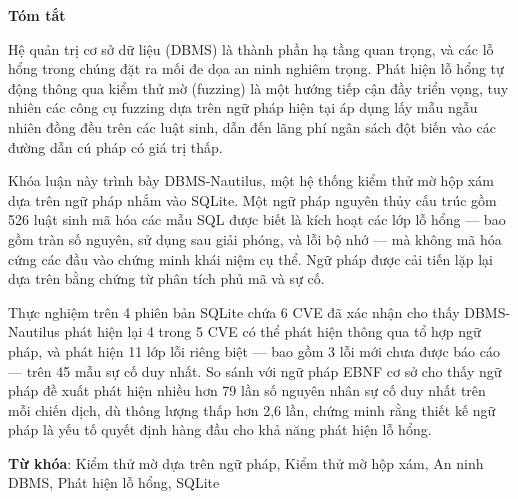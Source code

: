 \begin{center}
\textbf{\large{Tóm tắt}}
\end{center}

\begin{small}

Hệ quản trị cơ sở dữ liệu (DBMS) là thành phần hạ tầng quan trọng, và các lỗ hổng trong chúng đặt ra mối đe dọa an ninh nghiêm trọng. Phát hiện lỗ hổng tự động thông qua kiểm thử mờ (fuzzing) là một hướng tiếp cận đầy triển vọng, tuy nhiên các công cụ fuzzing dựa trên ngữ pháp hiện tại áp dụng lấy mẫu ngẫu nhiên đồng đều trên các luật sinh, dẫn đến lãng phí ngân sách đột biến vào các đường dẫn cú pháp có giá trị thấp.

Khóa luận này trình bày DBMS-Nautilus, một hệ thống kiểm thử mờ hộp xám dựa trên ngữ pháp nhắm vào SQLite. Một ngữ pháp nguyên thủy cấu trúc gồm 526 luật sinh mã hóa các mẫu SQL được biết là kích hoạt các lớp lỗ hổng --- bao gồm tràn số nguyên, sử dụng sau giải phóng, và lỗi bộ nhớ --- mà không mã hóa cứng các đầu vào chứng minh khái niệm cụ thể. Ngữ pháp được cải tiến lặp lại dựa trên bằng chứng từ phân tích phủ mã và sự cố.

Thực nghiệm trên 4 phiên bản SQLite chứa 6 CVE đã xác nhận cho thấy DBMS-Nautilus phát hiện lại 4 trong 5 CVE có thể phát hiện thông qua tổ hợp ngữ pháp, và phát hiện 11 lớp lỗi riêng biệt --- bao gồm 3 lỗi mới chưa được báo cáo --- trên 45 mẫu sự cố duy nhất. So sánh với ngữ pháp EBNF cơ sở cho thấy ngữ pháp đề xuất phát hiện nhiều hơn 79 lần số nguyên nhân sự cố duy nhất trên mỗi chiến dịch, dù thông lượng thấp hơn 2,6 lần, chứng minh rằng thiết kế ngữ pháp là yếu tố quyết định hàng đầu cho khả năng phát hiện lỗ hổng.

\vspace*{1cm}
\textbf{Từ khóa}: Kiểm thử mờ dựa trên ngữ pháp, Kiểm thử mờ hộp xám, An ninh DBMS, Phát hiện lỗ hổng, SQLite
\end{small}
